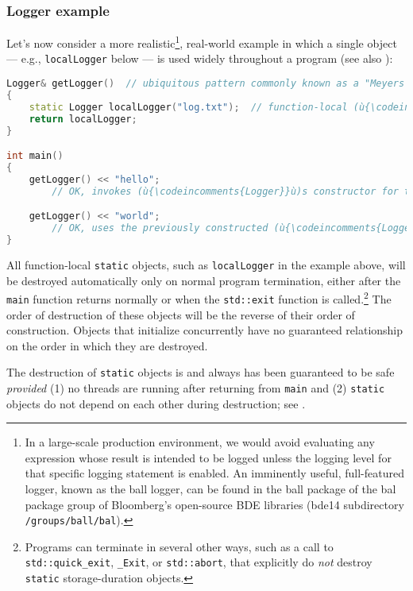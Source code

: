 \subsubsection[Logger example]{Logger example}\label{logger-example}

Let's now consider a more realistic{\cprotect\footnote{In a large-scale
production environment, we would avoid evaluating any expression whose
result is intended to be logged unless the logging level for that
specific logging statement is enabled. An imminently useful,
full-featured logger, known as the {ball} logger, can be found in the
{ball} package of the {bal} package group of Bloomberg's open-source
  BDE libraries ({bde14} subdirectory \lstinline!/groups/ball/bal!).}},
real-world example in which a single object --- e.g.,
\lstinline!localLogger! below --- is used widely throughout a program (see
also ):

\begin{lstlisting}[language=C++]
Logger& getLogger()  // ubiquitous pattern commonly known as a "Meyers Singleton"
{
    static Logger localLogger("log.txt");  // function-local (ù{\codeincomments{static}}ù) definition
    return localLogger;
}

int main()
{
    getLogger() << "hello";
        // OK, invokes (ù{\codeincomments{Logger}}ù)s constructor for the first (and only) time.

    getLogger() << "world";
        // OK, uses the previously constructed (ù{\codeincomments{Logger}}ù) instance.
}
\end{lstlisting}
    
\noindent All function-local \lstinline!static! objects, such as \lstinline!localLogger!
in the example above, will be destroyed automatically only on normal
program termination, either after the \lstinline!main! function returns
normally or when the \lstinline!std::exit! function is
called.{\cprotect\footnote{Programs can terminate in several other ways,
such as a call to \lstinline!std::quick_exit!, \lstinline!_Exit!, or
\lstinline!std::abort!, that explicitly do \emph{not} destroy
  \lstinline!static! storage-duration objects.}} The order of destruction
of these objects will be the reverse of their order of construction.
Objects that initialize concurrently have no guaranteed relationship on
the order in which they are destroyed.

The destruction of  \lstinline!static! objects is
and always has been guaranteed to be safe \emph{provided} (1) no threads
are running after returning from \lstinline!main! and (2)
 \lstinline!static! objects do not depend on each
other during destruction; see .

